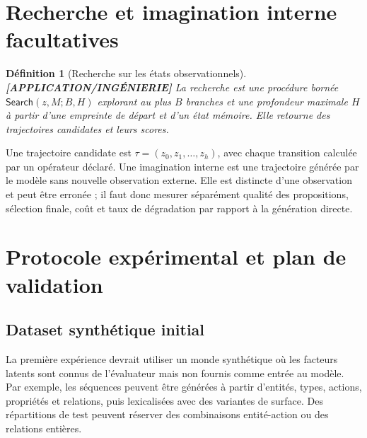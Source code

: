 \documentclass[11pt,a4paper]{article}
\newtheorem{definition}{Définition}[section]
\theoremstyle{remark}
\begin{document}
\section{Recherche et imagination interne facultatives}

\begin{definition}[Recherche sur les états observationnels] \textbf{[APPLICATION/INGÉNIERIE]}
La recherche est une procédure bornée $\mathsf{Search}(z,M;B,H)$ explorant au plus $B$ branches et une profondeur maximale $H$ à partir d'une empreinte de départ et d'un état mémoire. Elle retourne des trajectoires candidates et leurs scores.
\end{definition}

Une trajectoire candidate est $\tau=(z_0,z_1,\ldots,z_h)$, avec chaque transition calculée par un opérateur déclaré. Une imagination interne est une trajectoire générée par le modèle sans nouvelle observation externe. Elle est distincte d'une observation et peut être erronée ; il faut donc mesurer séparément qualité des propositions, sélection finale, coût et taux de dégradation par rapport à la génération directe.

\section{Protocole expérimental et plan de validation}

\subsection{Dataset synthétique initial}
La première expérience devrait utiliser un monde synthétique où les facteurs latents sont connus de l'évaluateur mais non fournis comme entrée au modèle. Par exemple, les séquences peuvent être générées à partir d'entités, types, actions, propriétés et relations, puis lexicalisées avec des variantes de surface. Des répartitions de test peuvent réserver des combinaisons entité-action ou des relations entières.
\end{document}
